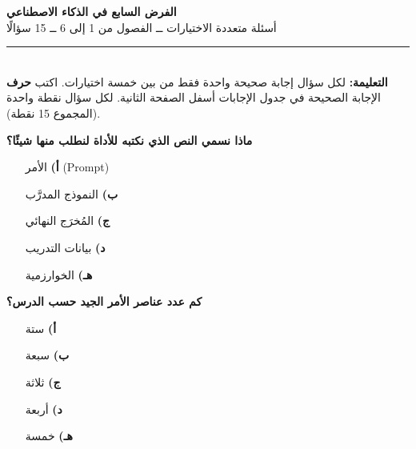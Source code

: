 \documentclass[11pt,a4paper]{article}
\begin{document}
\begin{center}
{\Large\khatt\textbf{الفرض السابع في الذكاء الاصطناعي}}\\[2pt]
{\normalsize أسئلة متعددة الاختيارات ــ الفصول من 1 إلى 6 ــ 15 سؤالًا}
\end{center}
\vspace{-4pt}\rule{\textwidth}{0.6pt}\\
{\small\textbf{التعليمة:} لكل سؤال إجابة صحيحة واحدة فقط من بين خمسة اختيارات.
اكتب \textbf{حرف} الإجابة الصحيحة في جدول الإجابات أسفل الصفحة الثانية.
لكل سؤال نقطة واحدة (المجموع 15 نقطة).}
\vspace{-2pt}
\begin{multicols}{2}

\noindent\begin{minipage}{\linewidth}
\hangindent=0.7cm\textbf{ماذا نسمي النص الذي نكتبه للأداة لنطلب منها شيئًا؟}
\begin{itemize}[leftmargin=0.95cm, labelsep=4pt, itemsep=0pt, topsep=2pt, parsep=0pt]
  \item[\textbf{أ)}] الأمر (\textenglish{Prompt})
  \item[\textbf{ب)}] النموذج المدرَّب
  \item[\textbf{ج)}] المُخرَج النهائي
  \item[\textbf{د)}] بيانات التدريب
  \item[\textbf{هـ)}] الخوارزمية
\end{itemize}
\end{minipage}\par\vspace{7pt plus 4pt}
\noindent\begin{minipage}{\linewidth}
\hangindent=0.7cm\textbf{كم عدد عناصر الأمر الجيد حسب الدرس؟}
\begin{itemize}[leftmargin=0.95cm, labelsep=4pt, itemsep=0pt, topsep=2pt, parsep=0pt]
  \item[\textbf{أ)}] ستة
  \item[\textbf{ب)}] سبعة
  \item[\textbf{ج)}] ثلاثة
  \item[\textbf{د)}] أربعة
  \item[\textbf{هـ)}] خمسة
\end{itemize}
\end{minipage}\par\vspace{7pt plus 4pt}
\noindent\begin{minipage}{\linewidth}

\end{minipage}
\end{multicols}
\end{document}
